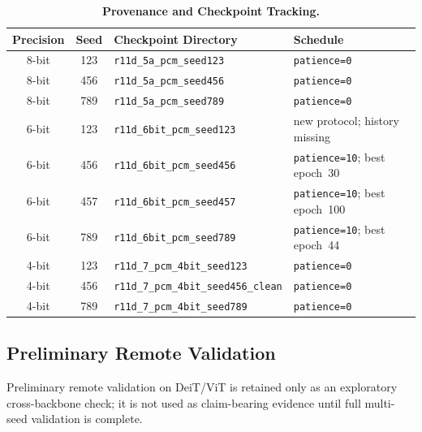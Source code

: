 \begin{table}[htbp]
\centering
\caption{\textbf{Provenance and Checkpoint Tracking.}}
\label{tab:supp_provenance}
\small
\setlength{\tabcolsep}{3pt}
\begin{tabular}{@{}ccp{}p{}@{}}
\toprule
\textbf{Precision} & \textbf{Seed} & \textbf{Checkpoint Directory} & \textbf{Schedule} \\
\midrule
8-bit & 123 & \texttt{r11d\_5a\_pcm\_seed123} & \texttt{patience=0} \\
8-bit & 456 & \texttt{r11d\_5a\_pcm\_seed456} & \texttt{patience=0} \\
8-bit & 789 & \texttt{r11d\_5a\_pcm\_seed789} & \texttt{patience=0} \\
6-bit & 123 & \texttt{r11d\_6bit\_pcm\_seed123} & new protocol; history missing \\
6-bit & 456 & \texttt{r11d\_6bit\_pcm\_seed456} & \texttt{patience=10}; best epoch~30 \\
6-bit & 457 & \texttt{r11d\_6bit\_pcm\_seed457} & \texttt{patience=10}; best epoch~100 \\
6-bit & 789 & \texttt{r11d\_6bit\_pcm\_seed789} & \texttt{patience=10}; best epoch~44 \\
4-bit & 123 & \texttt{r11d\_7\_pcm\_4bit\_seed123} & \texttt{patience=0} \\
4-bit & 456 & \texttt{r11d\_7\_pcm\_4bit\_seed456\_clean} & \texttt{patience=0} \\
4-bit & 789 & \texttt{r11d\_7\_pcm\_4bit\_seed789} & \texttt{patience=0} \\
\bottomrule
\end{tabular}
\end{table}

\subsection{Preliminary Remote Validation}
\label{subsec:supp-remote-validation}

Preliminary remote validation on DeiT/ViT is retained only as an exploratory cross-backbone check; it is not used as claim-bearing evidence until full multi-seed validation is complete.
